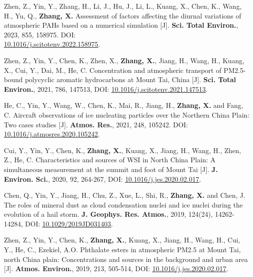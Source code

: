 \begin{enumerate}[label={[\arabic*]}, leftmargin=20pt, widest=0, itemindent=*, topsep=0pt, partopsep=0pt, parsep=0pt]

\item Zhen, Z., Yin, Y., Zhang, H., Li, J., Hu, J., Li, L., Kuang, X., Chen, K., Wang, H., Yu, Q., \textbf{Zhang, X.}
Assessment of factors affecting the diurnal variations of atmospheric PAHs based on a numerical simulation [J].
\textbf{Sci. Total Environ.}, 2023, 855, 158975.
DOI: \\\underline{\href{https://doi.org/10.1016/j.scitotenv.2022.158975}{10.1016/j.scitotenv.2022.158975}}.


\item Zhen, Z., Yin, Y., Chen, K., Zhen, X., \textbf{Zhang, X.}, Jiang, H., Wang, H., Kuang, X., Cui, Y.,
Dai, M., He, C.
Concentration and atmospheric transport of PM2.5-bound polycyclic aromatic hydrocarbons at Mount Tai, China [J].
\textbf{Sci. Total Environ.}, 2021, 786, 147513,
DOI: \underline{\href{https://doi.org/10.1016/j.scitotenv.2021.147513}{10.1016/j.scitotenv.2021.147513}}.

\item He, C., Yin, Y., Wang, W., Chen, K., Mai, R., Jiang, H., \textbf{Zhang, X.} and Fang, C. Aircraft observations of ice nucleating particles over the Northern China Plain: Two cases studies [J].
\textbf{Atmos. Res.}, 2021, 248, 105242.
DOI: \underline{\href{https://doi.org/10.1016/j.atmosres.2020.105242}{10.1016/j.atmosres.2020.105242}}.

\item Cui, Y., Yin, Y., Chen, K., \textbf{Zhang, X.}, Kuang, X., Jiang, H., Wang, H., Zhen, Z., He, C.
Characteristics and sources of WSI in North China Plain: A simultaneous measurement at the summit and foot of Mount Tai [J].
\textbf{J. Environ. Sci.}, 2020, 92, 264-267,
DOI: \underline{\href{https://doi.org/10.1016/j.jes.2020.02.017}{10.1016/j.jes.2020.02.017}}.

\item Chen, Q., Yin, Y., Jiang, H., Chu, Z., Xue, L., Shi, R., \textbf{Zhang, X.} and Chen, J.
The roles of mineral dust as cloud condensation nuclei and ice nuclei during the evolution of a hail storm.
\textbf{J. Geophys. Res. Atmos.}, 2019, 124(24), 14262-14284,
DOI: \underline{\href{https://doi.org/10.1029/2019JD031403}{10.1029/2019JD031403}}.

\item Zhen, Z., Yin, Y., Chen, K., \textbf{Zhang, X.}, Kuang, X., Jiang, H., Wang, H., Cui, Y., He, C.,
Ezekiel, A.O.
Phthalate esters in atmospheric PM2.5 at Mount Tai, north China plain: Concentrations and sources in the background and urban area [J].
\textbf{Atmos. Environ.}, 2019, 213, 505-514,
DOI: \underline{\href{https://doi.org/10.1016/j.atmosenv.2019.06.039}{10.1016/j.jes.2020.02.017}}.

\end{enumerate}

